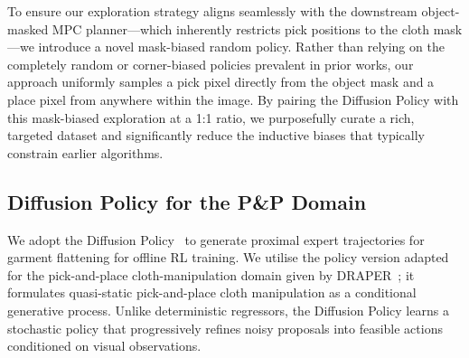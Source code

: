 \documentclass[journal]{IEEEtran}
\newcommand{\addinfo}[1]{\textcolor{myPurple}{#1}}
\begin{document}
\addinfo{To ensure our exploration strategy aligns seamlessly with the downstream object-masked MPC planner---which inherently restricts pick positions to the cloth mask---we introduce a novel mask-biased random policy. Rather than relying on the completely random or corner-biased policies prevalent in prior works, our approach uniformly samples a pick pixel directly from the object mask and a place pixel from anywhere within the image. By pairing the Diffusion Policy with this mask-biased exploration at a 1:1 ratio, we purposefully curate a rich, targeted dataset and significantly reduce the inductive biases that typically constrain earlier algorithms.}
\addinfo{\subsection{Diffusion Policy for the P\&P Domain} \label{sec:diffusion}}

\addinfo{We adopt the Diffusion Policy~\cite{chi2023diffusionpolicy} to generate proximal expert trajectories for garment flattening for offline RL training. We utilise the policy version adapted for the pick-and-place cloth-manipulation domain given by \textsc{DRAPER}~\cite{kadi2025draper}; it formulates quasi-static pick-and-place cloth manipulation as a conditional generative process. Unlike deterministic regressors, the Diffusion Policy learns a stochastic policy that progressively refines noisy proposals into feasible actions conditioned on visual observations.}
\end{document}
